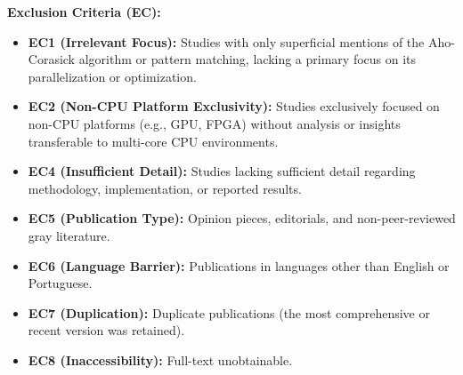 \textbf{Exclusion Criteria (EC):}
\begin{itemize}
    \item \textbf{EC1 (Irrelevant Focus):} Studies with only superficial mentions of the Aho-Corasick algorithm or pattern matching, lacking a primary focus on its parallelization or optimization.
    \item \textbf{EC2 (Non-CPU Platform Exclusivity):} Studies exclusively focused on non-CPU platforms (e.g., GPU, FPGA) without analysis or insights transferable to multi-core CPU environments.
    \item \textbf{EC4 (Insufficient Detail):} Studies lacking sufficient detail regarding methodology, implementation, or reported results.
    \item \textbf{EC5 (Publication Type):} Opinion pieces, editorials, and non-peer-reviewed gray literature.
    \item \textbf{EC6 (Language Barrier):} Publications in languages other than English or Portuguese.
    \item \textbf{EC7 (Duplication):} Duplicate publications (the most comprehensive or recent version was retained).
    \item \textbf{EC8 (Inaccessibility):} Full-text unobtainable.
\end{itemize}


